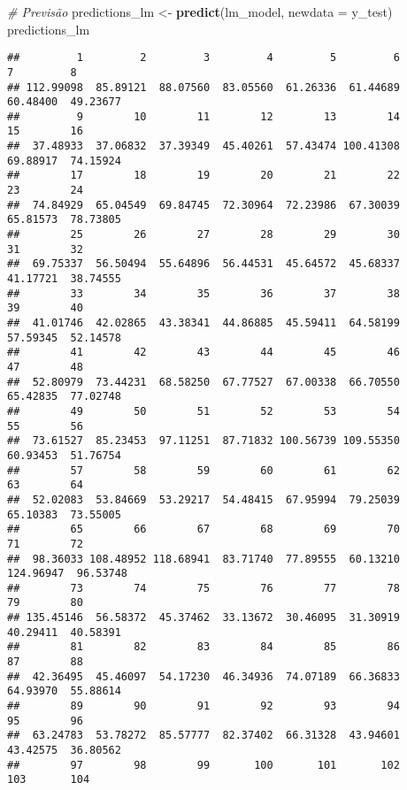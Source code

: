 \documentclass[
]{article}
\newenvironment{Shaded}{\begin{snugshade}}{\end{snugshade}}
\newcommand{\AttributeTok}[1]{\textcolor[rgb]{0.13,0.29,0.53}{#1}}
\newcommand{\CommentTok}[1]{\textcolor[rgb]{0.56,0.35,0.01}{\textit{#1}}}
\newcommand{\FunctionTok}[1]{\textcolor[rgb]{0.13,0.29,0.53}{\textbf{#1}}}
\newcommand{\NormalTok}[1]{#1}
\newcommand{\OtherTok}[1]{\textcolor[rgb]{0.56,0.35,0.01}{#1}}
\begin{document}
\begin{Shaded}
\begin{Highlighting}[]
\CommentTok{\# Previsão}
\NormalTok{predictions\_lm }\OtherTok{\textless{}{-}} \FunctionTok{predict}\NormalTok{(lm\_model, }\AttributeTok{newdata =}\NormalTok{ y\_test)}
\NormalTok{predictions\_lm}
\end{Highlighting}
\end{Shaded}

\begin{verbatim}
##         1         2         3         4         5         6         7         8 
## 112.99098  85.89121  88.07560  83.05560  61.26336  61.44689  60.48400  49.23677 
##         9        10        11        12        13        14        15        16 
##  37.48933  37.06832  37.39349  45.40261  57.43474 100.41308  69.88917  74.15924 
##        17        18        19        20        21        22        23        24 
##  74.84929  65.04549  69.84745  72.30964  72.23986  67.30039  65.81573  78.73805 
##        25        26        27        28        29        30        31        32 
##  69.75337  56.50494  55.64896  56.44531  45.64572  45.68337  41.17721  38.74555 
##        33        34        35        36        37        38        39        40 
##  41.01746  42.02865  43.38341  44.86885  45.59411  64.58199  57.59345  52.14578 
##        41        42        43        44        45        46        47        48 
##  52.80979  73.44231  68.58250  67.77527  67.00338  66.70550  65.42835  77.02748 
##        49        50        51        52        53        54        55        56 
##  73.61527  85.23453  97.11251  87.71832 100.56739 109.55350  60.93453  51.76754 
##        57        58        59        60        61        62        63        64 
##  52.02083  53.84669  53.29217  54.48415  67.95994  79.25039  65.10383  73.55005 
##        65        66        67        68        69        70        71        72 
##  98.36033 108.48952 118.68941  83.71740  77.89555  60.13210 124.96947  96.53748 
##        73        74        75        76        77        78        79        80 
## 135.45146  56.58372  45.37462  33.13672  30.46095  31.30919  40.29411  40.58391 
##        81        82        83        84        85        86        87        88 
##  42.36495  45.46097  54.17230  46.34936  74.07189  66.36833  64.93970  55.88614 
##        89        90        91        92        93        94        95        96 
##  63.24783  53.78272  85.57777  82.37402  66.31328  43.94601  43.42575  36.80562 
##        97        98        99       100       101       102       103       104 

\end{verbatim}
\end{document}
